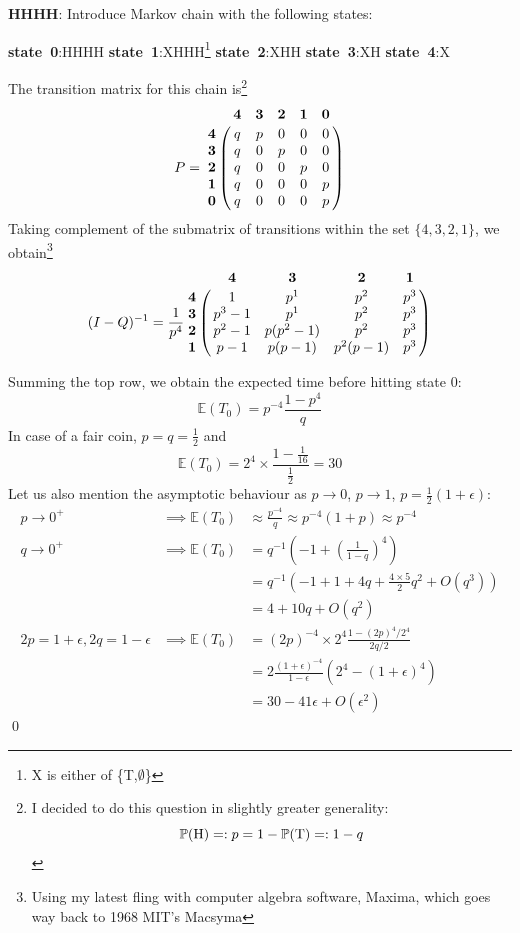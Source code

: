 \documentclass[8pt,notitlepage,twocolumn]{report}
\newenvironment{solution}[1][Solution]{\begin{trivlist}
    \item[\hskip \labelsep {\bfseries #1}]}{\end{trivlist}}
\begin{document}
\begin{solution}
{\bf HHHH}:
Introduce Markov chain with the following states:

	{\bf state~0}:{HHHH}
	{\bf state~1}:{XHHH\footnote{X is either of \{T,$\emptyset$\}}}
	{\bf state~2}:{XHH}
	{\bf state~3}:{XH}
	{\bf state~4}:{X}

The transition matrix for this chain is\footnote{
	I decided to do this question in slightly greater generality:
	$$\mathbb{P}({\rm H}) =: p = 1 - \mathbb{P}({\rm T}) =: 1-q $$
}
\begin{equation}
P = 
\bordermatrix{
		&\mathbf{4} 	& \mathbf{3} 	& \mathbf{2} 	& \mathbf{1} 	& \mathbf{0} 	\cr
\mathbf{4} 	& 	q 	& 	p 	& 	0 	& 	0 	& 0 		\cr
\mathbf{3} & q & 0 & p & 0 & 0		\cr
\mathbf{2} & q & 0 & 0 & p & 0		\cr
\mathbf{1} & q & 0 & 0 & 0 & p		\cr
\mathbf{0} & q & 0 & 0 & 0 & p
}
\end{equation}
Taking complement of the submatrix of transitions within the set $\{4,3,2,1\}$, 
we obtain\footnote{
	Using my latest fling with computer algebra software, 
	{\rm Maxima}, which goes way back to 1968 {\rm MIT}'s {\rm Macsyma} 
}
\begin{equation}
(I-Q)^{-1} = \frac{1}{p^4}
\bordermatrix{
		&\mathbf{4} 	& \mathbf{3} 	& \mathbf{2} 	& \mathbf{1} 	\cr
\mathbf{4} 	& 	1 	& 	p^1 	& 	p^2 	& 	p^3 	\cr
\mathbf{3} 	& 	p^3-1 	& 	p^1	& 	p^2 	& 	p^3 	\cr
\mathbf{2} 	& 	p^2-1	& 	p(p^2-1)& 	p^2 	& 	p^3	\cr
\mathbf{1} 	& 	p-1	& 	p(p-1) 	& 	p^2(p-1)& 	p^3	\cr
}
\end{equation}

Summing the top row, we obtain the expected time before hitting state $0$:
\begin{equation}
\mathbb{E}(T_0) = p^{-4} \frac{1-p^4}{q} 
\end{equation}
In case of a fair coin, $p=q=\frac{1}{2}$ and 
$$ \mathbb{E}(T_0) = 2^4 \times \frac{1-\frac{1}{16}}{\frac{1}{2}} = 30$$
Let us also mention the asymptotic behaviour as $p\to 0$, $p\to1$, $p=\frac{1}{2}(1+\epsilon)$:
\scriptsize
\begin{eqnarray*}
  p\to0^+ &\implies \mathbb{E}(T_0) &\approx \frac{p^{-4}}{q} \approx p^{-4} (1+p) \approx p^{-4} 	\\
  q\to0^+ &\implies \mathbb{E}(T_0) &= q^{-1} \left(-1+(\frac{1}{1-q})^4\right) 			\\
			& &= q^{-1} \left(-1 + 1 + 4q + \frac{4\times 5}{2}q^2 + O (q^3)\right) 	\\
			& &= 4 + 10q + O(q^2)								\\
  2p=1+\epsilon,2q=1-\epsilon &\implies \mathbb{E}(T_0) &= (2p)^{-4}\times2^4\frac{1-(2p)^4/2^4}{2q/2}\\
			& &= 2\frac{(1+\epsilon)^{-4}}{1-\epsilon}\left( 2^4-(1+\epsilon)^4 \right)	\\
			& &= 30 - 41\epsilon + O(\epsilon^2) 
\end{eqnarray*}
\normalsize
\qed
\end{solution}
\end{document}
